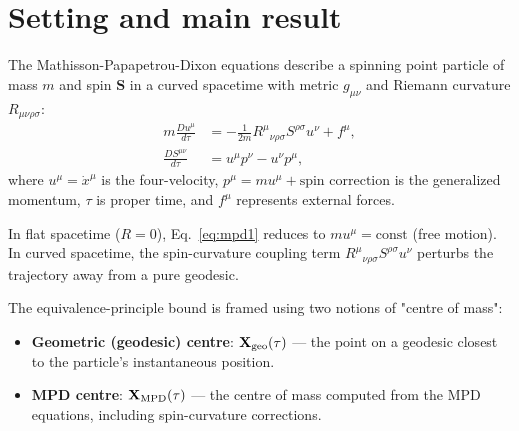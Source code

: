 \section{Setting and main result}
The Mathisson-Papapetrou-Dixon equations describe a spinning point particle of
mass $m$ and spin $\mathbf{S}$ in a curved spacetime with metric $g_{\mu\nu}$
and Riemann curvature $R_{\mu\nu\rho\sigma}$:
\begin{align}
m \frac{D u^\mu}{d\tau} &= -\frac{1}{2m} R^\mu{}_{\nu\rho\sigma} S^{\rho\sigma} u^\nu
+ f^\mu, \label{eq:mpd1} \\
\frac{D S^{\mu\nu}}{d\tau} &= u^\mu p^\nu - u^\nu p^\mu, \label{eq:mpd2}
\end{align}
where $u^\mu = \dot{x}^\mu$ is the four-velocity, $p^\mu = m u^\mu + \text{spin correction}$ is the
generalized momentum, $\tau$ is proper time, and $f^\mu$ represents external forces.

In flat spacetime ($R = 0$), Eq.~\eqref{eq:mpd1} reduces to $m u^\mu = \text{const}$
(free motion). In curved spacetime, the spin-curvature coupling term
$R^\mu{}_{\nu\rho\sigma} S^{\rho\sigma} u^\nu$ perturbs the trajectory away from a pure
geodesic.

The equivalence-principle bound is framed using two notions of "centre of mass":
\begin{itemize}
\item \textbf{Geometric (geodesic) centre}: $\mathbf{X}_{\rm geo}(\tau)$ — the point on a
  geodesic closest to the particle's instantaneous position.
\item \textbf{MPD centre}: $\mathbf{X}_{\rm MPD}(\tau)$ — the centre of mass computed from the
  MPD equations, including spin-curvature corrections.
\end{itemize}


